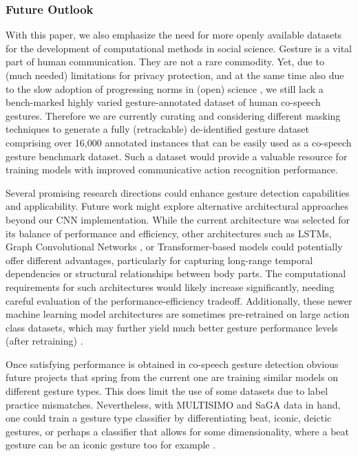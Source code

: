 \documentclass[11pt,headings=small,cleardoublepage=empty,tocflat,numbers=noenddot,twoside,captions=tableheading]{scrbook}
\begin{document}
\begin{refsection}
\begin{table}[H]
\begin{table}[H]
\begin{table}[H]
\begin{table}[H]
\subsubsection{Future Outlook}
With this paper, we also emphasize the need for more openly available datasets for the development of computational methods in social science. Gesture is a vital part of human communication. They are not a rare commodity. Yet, due to (much needed) limitations for privacy protection, and at the same time also due to the slow adoption of progressing norms in (open) science \parencite{resnikShouldResearchersDestroy2024}, we still lack a bench-marked highly varied gesture-annotated dataset of human co-speech gestures. Therefore we are currently curating and considering different masking techniques \parencite{owoyeleMaskedpiperMaskingPersonal2022,owoyeleMaskAnyoneToolkitOffering2024} to generate a fully (retrackable) de-identified gesture dataset comprising over 16,000 annotated instances that can be easily used as a co-speech gesture benchmark dataset. Such a dataset would provide a valuable resource for training models with improved communicative action recognition performance.

 Several promising research directions could enhance gesture detection capabilities and applicability. Future work might explore alternative architectural approaches beyond our CNN implementation. While the current architecture was selected for its balance of performance and efficiency, other architectures such as LSTMs\textcite{shahroudy2016skeleton}, Graph Convolutional Networks \textcite{yan2018stgcn, liu2020dcgcn}, or Transformer-based models \textcite{girdhar2019video, jiang2022inception} could potentially offer different advantages, particularly for capturing long-range temporal dependencies or structural relationships between body parts. The computational requirements for such architectures would likely increase significantly, needing careful evaluation of the performance-efficiency tradeoff. Additionally, these newer machine learning model architectures are sometimes pre-retrained on large action class datasets, which may further yield much better gesture performance levels (after retraining) \parencite{zhuMotionBERTUnifiedPerspective2023}.


Once satisfying performance is obtained in co-speech gesture detection obvious future projects that spring from the current one are training similar models on different gesture types. This does limit the use of some datasets due to label practice mismatches. Nevertheless, with MULTISIMO \parencite{koutsombogeraMULTISIMOMultimodalCorpus2017} and SaGA data  \parencite{luckingBielefeldSpeechGesture2010} in hand, one could train a gesture type classifier by differentiating beat, iconic, deictic gestures, or perhaps a classifier that allows for some dimensionality, where a beat gesture can be an iconic gesture too for example \parencite{rohrerTemporalPragmaticAnalysis2022}. 


\end{table}
\end{table}
\end{table}
\end{table}
\end{refsection}
\end{document}
